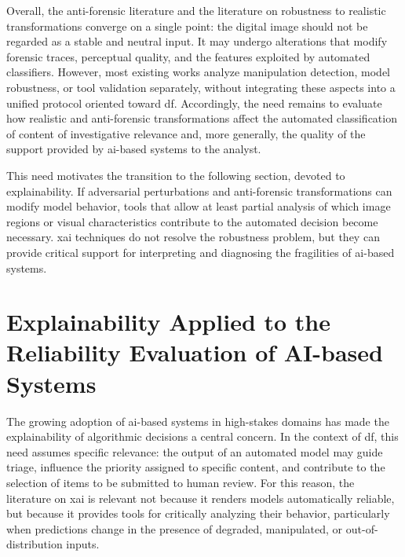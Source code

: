 Overall, the anti-forensic literature and the literature on robustness to
realistic transformations converge on a single point: the digital image should
not be regarded as a stable and neutral input. It may undergo alterations that
modify forensic traces, perceptual quality, and the features exploited by
automated classifiers. However, most existing works analyze manipulation
detection, model robustness, or tool validation separately, without integrating
these aspects into a unified protocol oriented toward \gls{df}. Accordingly,
the need remains to evaluate how realistic and anti-forensic transformations
affect the automated classification of content of investigative relevance and,
more generally, the quality of the support provided by \gls{ai}-based systems
to the analyst.

This need motivates the transition to the following section, devoted to
explainability. If adversarial perturbations and anti-forensic transformations
can modify model behavior, tools that allow at least partial analysis of which
image regions or visual characteristics contribute to the automated decision
become necessary. \gls{xai} techniques do not resolve the robustness problem,
but they can provide critical support for interpreting and diagnosing the
fragilities of \gls{ai}-based systems.


\section{Explainability Applied to the Reliability Evaluation of AI-based Systems}
\label{sec:sota-xai}

The growing adoption of \gls{ai}-based systems in high-stakes domains has made
the explainability of algorithmic decisions a central concern. In the context of
\gls{df}, this need assumes specific relevance: the output of an automated
model may guide triage, influence the priority assigned to specific content,
and contribute to the selection of items to be submitted to human review. For
this reason, the literature on \gls{xai} is relevant not because it renders
models automatically reliable, but because it provides tools for critically
analyzing their behavior, particularly when predictions change in the presence
of degraded, manipulated, or out-of-distribution inputs.

